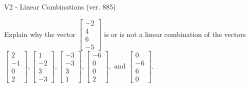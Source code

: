 \begin{exercise}
  \begin{exerciseTitle}V2 - Linear Combinations (ver. 885)\end{exerciseTitle}
  \begin{exerciseStatement}
    Explain why the vector \(\left[\begin{array}{c}
-2 \\
4 \\
6 \\
-5
\end{array}\right]\)  is or is not a linear 
	combination of the vectors \(\left[\begin{array}{c}
2 \\
-1 \\
0 \\
2
\end{array}\right] , \left[\begin{array}{c}
1 \\
-2 \\
3 \\
-3
\end{array}\right] , \left[\begin{array}{c}
-3 \\
-3 \\
3 \\
1
\end{array}\right] , \left[\begin{array}{c}
-6 \\
0 \\
0 \\
2
\end{array}\right] , \text{ and } \left[\begin{array}{c}
0 \\
-6 \\
6 \\
0
\end{array}\right]\).
	



\end{exerciseStatement}
\end{exercise}
